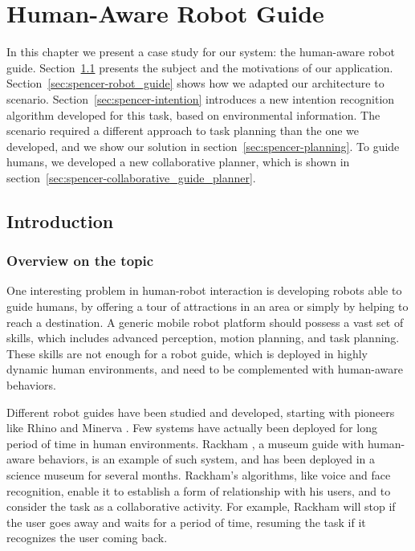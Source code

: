 
\chapter{Human-Aware Robot Guide} %

\label{chapter:spencer} %


 In this chapter we present a case study for our system: the human-aware robot guide. Section~\ref{sec:spencer-intro} presents the subject and the motivations of our application. Section~\ref{sec:spencer-robot_guide} shows how we adapted our architecture to scenario. Section~\ref{sec:spencer-intention} introduces a new intention recognition algorithm developed for this task, based on environmental information. The scenario required a different approach to task planning than the one we developed, and we show our solution in section~\ref{sec:spencer-planning}. To guide humans, we developed a new collaborative planner, which is shown in section~\ref{sec:spencer-collaborative_guide_planner}. 

\section{Introduction}
\label{sec:spencer-intro}
\subsection{Overview on the topic}
One interesting problem in human-robot interaction is developing robots able to guide humans, by offering a tour of attractions in an area or simply by helping to reach a destination.
A generic mobile robot platform should possess a vast set of skills, which includes advanced perception, motion planning, and task planning. These skills are not enough for a robot guide, which is deployed in highly dynamic human environments, and need to be complemented with human-aware behaviors.

Different robot guides have been studied and developed, starting with pioneers like Rhino and Minerva \citep{thrun2000probabilistic}.  Few systems have actually been deployed for long period of time in human environments. Rackham \citep{clodic2006rackham}, a museum guide with human-aware behaviors, is an example of such system, and has been deployed in a science museum for several months.  Rackham's algorithms, like voice and face recognition, enable it to establish a form of relationship with his users, and to consider the task as a collaborative activity. For example, Rackham will stop if the user goes away and waits for a period of time, resuming the task if it recognizes the user coming back.

